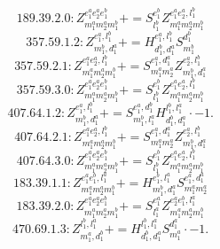 \documentclass[letterpaper,10pt,fleqn,leqno,onecolumn]{article}
\begin{document}
\begin{equation} \;\;\;\;\;\;  189.39.2.0: Z^{e_{1}^{a}e_{2}^{a}e_{1}^{b}}_{m_{1}^{a}m_{2}^{a}m_{1}^{b}}+=S^{e_{1}^{b}}_{l_{1}^{b}}Z^{e_{1}^{a}e_{2}^{a},l_{1}^{b}}_{m_{1}^{a}m_{2}^{a}m_{1}^{b}} \end{equation}
\begin{equation} \;\;\;\;\;\;  357.59.1.2: Z^{e_{1}^{a},l_{1}^{b}}_{m_{1}^{b},d_{1}^{a}}+=H^{e_{1}^{a},l_{1}^{b}}_{d_{1}^{b},d_{1}^{a}}S^{d_{1}^{b}}_{m_{1}^{b}} \end{equation}
\begin{equation} \;\;\;\;\;\;  357.59.2.1: Z^{e_{1}^{a}e_{2}^{a},l_{1}^{b}}_{m_{1}^{a}m_{2}^{a}m_{1}^{b}}+=S^{e_{1}^{a},d_{1}^{a}}_{m_{1}^{a}m_{2}^{a}}Z^{e_{2}^{a},l_{1}^{b}}_{m_{1}^{b},d_{1}^{a}} \end{equation}
\begin{equation} \;\;\;\;\;\;  357.59.3.0: Z^{e_{1}^{a}e_{2}^{a}e_{1}^{b}}_{m_{1}^{a}m_{2}^{a}m_{1}^{b}}+=S^{e_{1}^{b}}_{l_{1}^{b}}Z^{e_{1}^{a}e_{2}^{a},l_{1}^{b}}_{m_{1}^{a}m_{2}^{a}m_{1}^{b}} \end{equation}
\begin{equation} \;\;\;\;\;\;  407.64.1.2: Z^{e_{1}^{a},l_{1}^{b}}_{m_{1}^{b},d_{1}^{a}}+=S^{e_{1}^{a},d_{1}^{b}}_{m_{1}^{b},l_{1}^{a}}H^{l_{1}^{b},l_{1}^{a}}_{d_{1}^{b},d_{1}^{a}}\cdot -1. \end{equation}
\begin{equation} \;\;\;\;\;\;  407.64.2.1: Z^{e_{1}^{a}e_{2}^{a},l_{1}^{b}}_{m_{1}^{a}m_{2}^{a}m_{1}^{b}}+=S^{e_{1}^{a},d_{1}^{a}}_{m_{1}^{a}m_{2}^{a}}Z^{e_{2}^{a},l_{1}^{b}}_{m_{1}^{b},d_{1}^{a}} \end{equation}
\begin{equation} \;\;\;\;\;\;  407.64.3.0: Z^{e_{1}^{a}e_{2}^{a}e_{1}^{b}}_{m_{1}^{a}m_{2}^{a}m_{1}^{b}}+=S^{e_{1}^{b}}_{l_{1}^{b}}Z^{e_{1}^{a}e_{2}^{a},l_{1}^{b}}_{m_{1}^{a}m_{2}^{a}m_{1}^{b}} \end{equation}
\begin{equation} \;\;\;\;\;\;  183.39.1.1: Z^{e_{1}^{a}e_{1}^{b},l_{1}^{a}}_{m_{1}^{a}m_{2}^{a}m_{1}^{b}}+=H^{e_{1}^{b},l_{1}^{a}}_{m_{1}^{b},d_{1}^{a}}S^{e_{1}^{a},d_{1}^{a}}_{m_{1}^{a}m_{2}^{a}} \end{equation}
\begin{equation} \;\;\;\;\;\;  183.39.2.0: Z^{e_{1}^{a}e_{2}^{a}e_{1}^{b}}_{m_{1}^{a}m_{2}^{a}m_{1}^{b}}+=S^{e_{1}^{a}}_{l_{1}^{a}}Z^{e_{2}^{a}e_{1}^{b},l_{1}^{a}}_{m_{1}^{a}m_{2}^{a}m_{1}^{b}} \end{equation}
\begin{equation} \;\;\;\;\;\;  470.69.1.3: Z^{l_{1}^{b},l_{1}^{a}}_{m_{1}^{a},d_{1}^{b}}+=H^{l_{1}^{b},l_{1}^{a}}_{d_{1}^{b},d_{1}^{a}}S^{d_{1}^{a}}_{m_{1}^{a}}\cdot -1. \end{equation}
\end{document}

